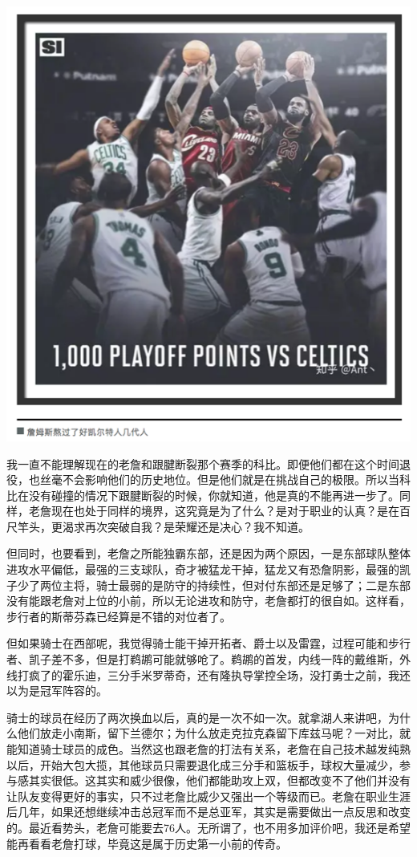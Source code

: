 \documentclass[
]{book}
\begin{document}
\includegraphics[width=7.75in]{images/nba7}

我一直不能理解现在的老詹和跟腱断裂那个赛季的科比。即便他们都在这个时间退役，也丝毫不会影响他们的历史地位。但是他们就是在挑战自己的极限。所以当科比在没有碰撞的情况下跟腱断裂的时候，你就知道，他是真的不能再进一步了。同样，老詹现在也处于同样的境界，这究竟是为了什么？是对于职业的认真？是在百尺竿头，更渴求再次突破自我？是荣耀还是决心？我不知道。

但同时，也要看到，老詹之所能独霸东部，还是因为两个原因，一是东部球队整体进攻水平偏低，最强的三支球队，奇才被猛龙干掉，猛龙又有恐詹阴影，最强的凯子少了两位主将，骑士最弱的是防守的持续性，但对付东部还是足够了；二是东部没有能跟老詹对上位的小前，所以无论进攻和防守，老詹都打的很自如。这样看，步行者的斯蒂芬森已经算是不错的对位者了。

但如果骑士在西部呢，我觉得骑士能干掉开拓者、爵士以及雷霆，过程可能和步行者、凯子差不多，但是打鹈鹕可能就够呛了。鹈鹕的首发，内线一阵的戴维斯，外线打疯了的霍乐迪，三分手米罗蒂奇，还有隆执导掌控全场，没打勇士之前，我还以为是冠军阵容的。

骑士的球员在经历了两次换血以后，真的是一次不如一次。就拿湖人来讲吧，为什么他们放走小南斯，留下兰德尔；为什么放走克拉克森留下库兹马呢？一对比，就能知道骑士球员的成色。当然这也跟老詹的打法有关系，老詹在自己技术越发纯熟以后，开始大包大揽，其他球员只需要退化成三分手和篮板手，球权大量减少，参与感其实很低。这其实和威少很像，他们都能助攻上双，但都改变不了他们并没有让队友变得更好的事实，只不过老詹比威少又强出一个等级而已。老詹在职业生涯后几年，如果还想继续冲击总冠军而不是总亚军，其实是需要做出一点反思和改变的。最近看势头，老詹可能要去76人。无所谓了，也不用多加评价吧，我还是希望能再看看老詹打球，毕竟这是属于历史第一小前的传奇。
\end{document}
